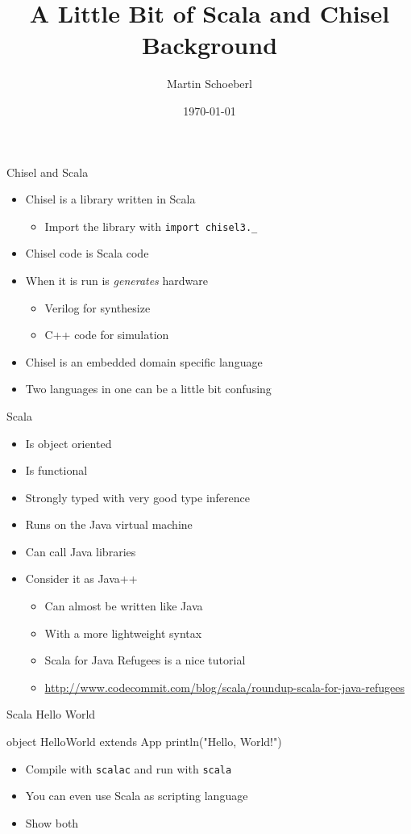 \documentclass[xcolor=pdflatex,dvipsnames,table]{beamer}
\title{A Little Bit of Scala and Chisel Background}
\author{Martin Schoeberl}
\date{\today}
\institute{Technical University of Denmark}
\newcommand{\code}[1]{{\texttt{#1}}}
\begin{document}
\begin{frame}
\titlepage
\end{frame}

\begin{frame}[fragile]{Chisel and Scala}
\begin{itemize}
\item Chisel is a library written in Scala
\begin{itemize}
\item Import the library with \code{import chisel3.\_}
\end{itemize}
\item Chisel code is Scala code
\item When it is run is \emph{generates} hardware
\begin{itemize}
\item Verilog for synthesize
\item C++ code for simulation
\end{itemize}
\item Chisel is an embedded domain specific language
\item Two languages in one can be a little bit confusing
\end{itemize}
\end{frame}

\begin{frame}[fragile]{Scala}
\begin{itemize}
\item Is object oriented
\item Is functional
\item Strongly typed with very good type inference
\item Runs on the Java virtual machine
\item Can call Java libraries
\item Consider it as Java++
\begin{itemize}
\item Can almost be written like Java
\item With a more lightweight syntax
\item Scala for Java Refugees is a nice tutorial
\item \url{http://www.codecommit.com/blog/scala/roundup-scala-for-java-refugees}
\end{itemize}
\end{itemize}
\end{frame}

\begin{frame}[fragile]{Scala Hello World}
\begin{chisel}
object HelloWorld extends App {
  println("Hello, World!")
}
\end{chisel}
\begin{itemize}
\item Compile with \code{scalac} and run with \code{scala}
\item You can even use Scala as scripting language
\item Show both
\end{itemize}
\end{frame}
\end{document}
